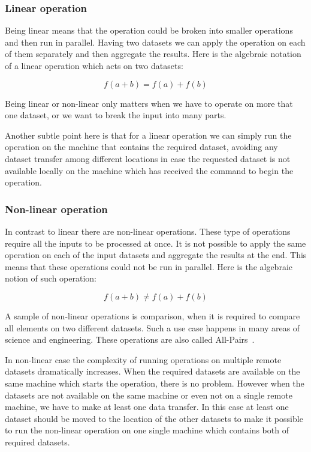 \subsubsection{Linear operation}
Being linear means that the operation
could be broken into smaller operations and then run in parallel. Having two datasets we can apply the
operation on each of them separately and then aggregate the results. Here is the algebraic notation
of a linear operation which acts on two datasets:

\[ f(a + b) = f(a) + f(b) \]

Being linear or non-linear only matters when we have to operate on more that one dataset, or we want to
break the input into many parts.

Another subtle point here is that for a linear operation we can simply run the operation on the machine that
contains the required dataset, avoiding any dataset transfer among different locations in case the requested
dataset is not available locally on the machine which has received the command to begin the operation.

\subsubsection{Non-linear operation}
In contrast to linear there are non-linear operations. These type of operations require all the inputs to be processed
at once. It is not possible to apply the same operation on each of the input datasets and aggregate the results at the
end. This means that these operations could not be run in parallel.
Here is the algebraic notion of such operation:

\[ f(a + b) \neq f(a) + f(b) \]

A sample of non-linear operations is comparison, when it is required to compare all elements on two different datasets. 
Such a use case happens in many areas of science and engineering. These operations are also called All-Pairs~\cite{moretti08}.

In non-linear case the complexity of running operations on multiple remote datasets dramatically increases. When the required
datasets are available on the same machine which starts the operation, there is no problem. However when the datasets are not
available on the same machine or even not on a single remote machine, we have to make at least one data transfer. In this 
case at least one dataset should be moved to the location of the other datasets to make it possible to run the non-linear
operation on one single machine which contains both of required datasets.

